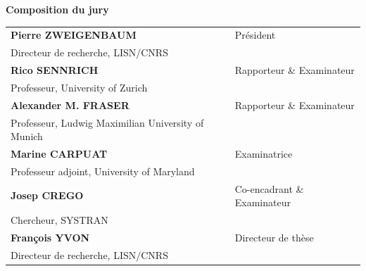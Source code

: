 \begin{titlepage}
\vspace{\fill} %

\bigskip

\flushleft
\small \textbf{Composition du jury}\\
\vspace{2mm}
\scriptsize
\begin{tabular}{|p{7cm}l}
\arrayrulecolor{Prune}
\textbf{Pierre ZWEIGENBAUM} &   Président\\ 
Directeur de recherche, LISN$/$CNRS & \\
\textbf{Rico SENNRICH} &  Rapporteur \& Examinateur  \\ 
Professeur, University of Zurich &   \\ 
\textbf{Alexander M. FRASER} &  Rapporteur \& Examinateur  \\ 
Professeur, Ludwig Maximilian University of Munich  &   \\ 
\textbf{Marine CARPUAT} &  Examinatrice \\ 
Professeur adjoint, University of Maryland &   \\ 
\textbf{Josep CREGO} & Co-encadrant \& Examinateur \\ 
Chercheur, SYSTRAN  \\ 
\textbf{François YVON} &  Directeur de thèse \\ 
Directeur de recherche, LISN$/$CNRS  &   \\ 
\end{tabular} 

\end{titlepage}

